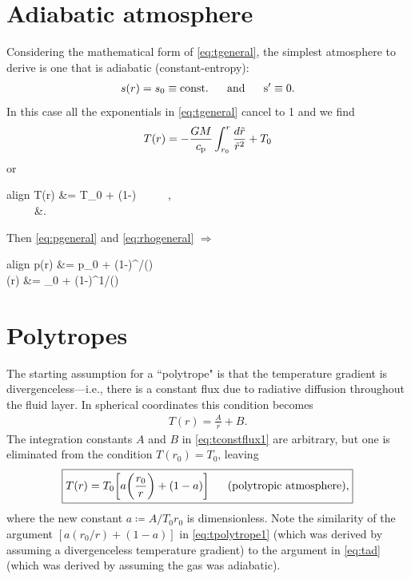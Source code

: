 \documentclass[12pt]{article} %
\newcommand{\bigfrac}[2]{\bigg{(}\frac{#1}{#2}\bigg{)}}
\begin{document}
	\section{Adiabatic atmosphere}
	Considering the mathematical form of \eqref{eq:tgeneral}, the simplest atmosphere to derive is one that is adiabatic (constant-entropy):
	\begin{align}
	s(r)=s_0\equiv\rm{const.} \ \ \ \ \ \text{and}\ \ \ \ \  s^\prime \equiv 0.
	\label{eq:sconst}
	\end{align}
	In this case all the exponentials in \eqref{eq:tgeneral} cancel to 1 and  we find 
	\begin{align*}
	T(r) = -\frac{GM}{c_{\rm{p}}}\int_{r_0}^r\frac{d\tilde{r}}{\tilde{r}^2} + T_0
	\end{align*}
	or
	\begin{empheq}[box=\fbox]{align}
	T(r) &= T_0\bigg{[}\bigfrac{r_0}{r} + (1-)\bigg{]}  \ \ \ \ \ ,\label{eq:tad}\\
	 \ \ \ \ \ &\coloneqq {}.\label{def:atilde}
	\end{empheq}
	Then \eqref{eq:pgeneral} and \eqref{eq:rhogeneral} $\Longrightarrow$
	\begin{empheq}[box=\fbox]{align}
	p(r) &= p_0 \bigg{[}\bigfrac{r_0}{r} + (1-)\bigg{]}^{\gamma/()} \ \ \ \ \ 
\label{eq:pad}\\
\andd	\rho(r) &= \rho_0 \bigg{[}\bigfrac{r_0}{r} + (1-)\bigg{]}^{1/()} \ \ \ \ \ 
\label{eq:rhoad}
\end{empheq}

\section{Polytropes}
The starting assumption for a ``polytrope" is that the temperature gradient is divergenceless---i.e., there is a constant flux due to radiative diffusion throughout the fluid layer. In 
spherical coordinates this condition becomes
\begin{align}
T(r) = \frac{A}{r} + B.
\label{eq:tconstflux1}
\end{align}
The integration constants $A$ and $B$ in \eqref{eq:tconstflux1} are arbitrary, but one is eliminated from the condition $T(r_0) = T_0$, leaving
\begin{align}
\boxed{
T(r) = T_0 \bigg{[}a\bigg{(}\frac{r_0}{r}\bigg{)} + (1 - a)\bigg{]} \ \ \ \ \ \text{(polytropic atmosphere)},
}
\label{eq:tpolytrope1}
\end{align}
where the new constant $a\coloneqq A/T_0r_0$ is dimensionless. Note the similarity of the argument $[a(r_0/r) + (1-a)]$ in \eqref{eq:tpolytrope1} (which was derived by assuming a divergenceless temperature gradient) to the argument in \eqref{eq:tad} (which was derived by assuming the gas was adiabatic). 
\end{document}
